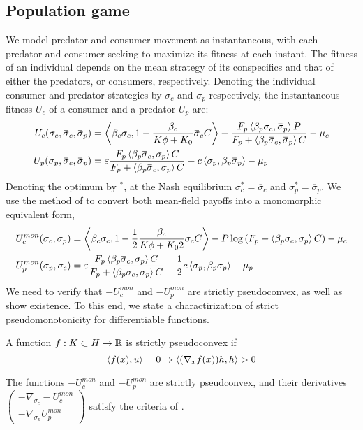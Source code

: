 \subsection*{Population game}
We model predator and consumer movement as instantaneous, with each predator and consumer seeking to maximize its fitness at each instant. The fitness of an individual depends on the mean strategy of its conspecifics and that of either the predators, or consumers, respectively. Denoting the individual consumer and predator strategies by $\sigma_c$ and $\sigma_p$ respectively, the instantaneous fitness $U_c$ of a consumer and a predator $U_p$ are:
\begin{align}
  U_c(\sigma_c, \overbar{\sigma}_c, \overbar{\sigma}_p) &= \ip{\beta_c \sigma_c}{1-\frac{\beta_c}{K\phi + K_0}\overbar{\sigma}_c C} - \frac{F_p \ip{\beta_p \sigma_c}{\overbar{\sigma}_p} P}{F_p + \ip{\beta_p \overbar{\sigma}_c}{\overbar{\sigma}_p} C} - \mu_c \\
  U_p(\sigma_p, \overbar{\sigma}_c, \overbar{\sigma}_p) &= \epsilon \frac{F_p \ip{\beta_p \overbar{\sigma}_c}{\sigma_p} C}{F_p + \ip{\beta_p \overbar{\sigma}_c}{\sigma_p} C} - c \ip{\sigma_p}{\beta_p \overbar{\sigma}_p}  - \mu_p
\end{align}
Denoting the optimum by $^*$, at the Nash equilibrium $\sigma_c^*=\overbar{\sigma}_c$ and $\sigma_p^* = \overbar{\sigma}_p$. We use the method of  to convert both mean-field payoffs into a monomorphic equivalent form,
\begin{align}
  U_c^{mon}(\sigma_c, \sigma_p) &= \ip{\beta_c \sigma_c}{1-\frac{1}{2}\frac{\beta_c}{K\phi + K_0 2}\sigma_c C} - P\log\pa{F_p + \ip{\beta_p \sigma_c}{\sigma_p} C} - \mu_c \\
  U^{mon}_p(\sigma_p, \sigma_c) &= \epsilon \frac{F_p \ip{\beta_p \overbar{\sigma}_c}{\sigma_p} C}{F_p + \ip{\beta_p \sigma_c}{\sigma_p} C} - \frac{1}{2}c \ip{\sigma_p}{\beta_p \sigma_p}  - \mu_p
\end{align}
We need to verify that $-U_c^{mon}$ and $-U_p^{mon}$ are strictly pseudoconvex, as well as show existence. To this end, we state a charactirization of strict pseudomonotonicity for differentiable functions.
\begin{lemma}
  A function $f: K \subset H \to \mathbb{R}$ is strictly pseudoconvex if
  \begin{equation}
    \left \langle f(x),u \right \rangle = 0 \Rightarrow \left \langle (\nabla_x f(x))h,h \right \rangle > 0
  \end{equation}
\end{lemma}
\begin{proposition}
  The functions $-U_c^{mon}$ and $-U_p^{mon}$ are strictly pseudconvex, and their derivatives $\begin{pmatrix}-\nabla_{\sigma_c} -U_c^{mon} \\ -\nabla_{\sigma_p} U_p^{mon}\end{pmatrix}$ satisfy the criteria of .
\end{proposition}
